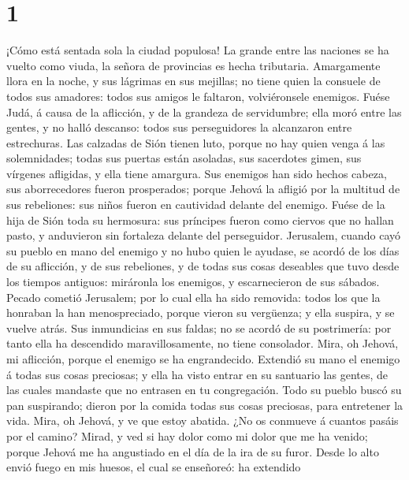 \hypertarget{section}{%
\section{1}\label{section}}

 ¡Cómo está sentada sola la ciudad populosa! La grande
entre las naciones se ha vuelto como viuda, la señora de provincias es
hecha tributaria.  Amargamente llora en la noche, y sus
lágrimas en sus mejillas; no tiene quien la consuele de todos sus
amadores: todos sus amigos le faltaron, volviéronsele enemigos.
 Fuése Judá, á causa de la aflicción, y de la grandeza de
servidumbre; ella moró entre las gentes, y no halló descanso: todos sus
perseguidores la alcanzaron entre estrechuras.  Las
calzadas de Sión tienen luto, porque no hay quien venga á las
solemnidades; todas sus puertas están asoladas, sus sacerdotes gimen,
sus vírgenes afligidas, y ella tiene amargura.  Sus
enemigos han sido hechos cabeza, sus aborrecedores fueron prosperados;
porque Jehová la afligió por la multitud de sus rebeliones: sus niños
fueron en cautividad delante del enemigo.  Fuése de la
hija de Sión toda su hermosura: sus príncipes fueron como ciervos que no
hallan pasto, y anduvieron sin fortaleza delante del perseguidor.
 Jerusalem, cuando cayó su pueblo en mano del enemigo y no
hubo quien le ayudase, se acordó de los días de su aflicción, y de sus
rebeliones, y de todas sus cosas deseables que tuvo desde los tiempos
antiguos: miráronla los enemigos, y escarnecieron de sus sábados.
 Pecado cometió Jerusalem; por lo cual ella ha sido
removida: todos los que la honraban la han menospreciado, porque vieron
su vergüenza; y ella suspira, y se vuelve atrás.  Sus
inmundicias en sus faldas; no se acordó de su postrimería: por tanto
ella ha descendido maravillosamente, no tiene consolador. Mira, oh
Jehová, mi aflicción, porque el enemigo se ha engrandecido.
 Extendió su mano el enemigo á todas sus cosas preciosas;
y ella ha visto entrar en su santuario las gentes, de las cuales
mandaste que no entrasen en tu congregación.  Todo su
pueblo buscó su pan suspirando; dieron por la comida todas sus cosas
preciosas, para entretener la vida. Mira, oh Jehová, y ve que estoy
abatida.  ¿No os conmueve á cuantos pasáis por el camino?
Mirad, y ved si hay dolor como mi dolor que me ha venido; porque Jehová
me ha angustiado en el día de la ira de su furor.  Desde
lo alto envió fuego en mis huesos, el cual se enseñoreó: ha extendido

